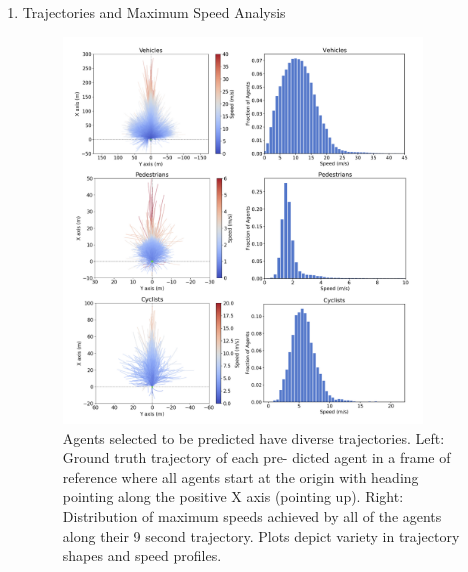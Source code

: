 \documentclass{article} %
\begin{document}
\begin{enumerate}
		\item Trajectories and Maximum Speed Analysis
		\begin{figure}[!htbp]
			\centering
			\includegraphics[width=0.9\textwidth]{Figures/Agents_Trajectories.png}
			\caption{Agents selected to be predicted have diverse
				trajectories. Left: Ground truth trajectory of each pre-
				dicted agent in a frame of reference where all agents start
				at the origin with heading pointing along the positive X
				axis (pointing up). Right: Distribution of maximum speeds
				achieved by all of the agents along their 9 second trajectory.
				Plots depict variety in trajectory shapes and speed profiles.}
			\label{fig:Dataset1}
		\end{figure}
	\end{enumerate}
	
\end{document}
